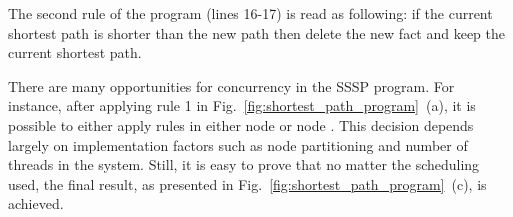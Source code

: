 The second rule of the program (lines 16-17) is read as following: if the
current shortest path  is shorter than the new path  then
delete the new  fact and keep the current shortest path.

There are many opportunities for concurrency in the SSSP program. For instance,
after applying rule 1 in Fig.~\ref{fig:shortest_path_program}~(a), it is
possible to either apply rules in either node  or node
. This decision depends largely on implementation factors such
as node partitioning and number of threads in the system.  Still, it is
easy to prove that no matter the scheduling used, the final result, as
presented in Fig.~\ref{fig:shortest_path_program}~(c), is achieved.


